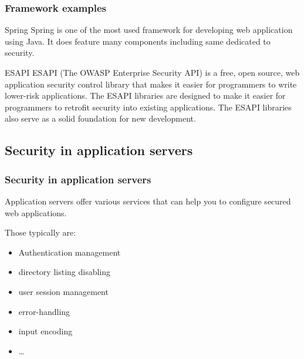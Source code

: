 \begin{frame}
\frametitle{Framework examples}

\begin{block}{Spring}
Spring is one of the most used framework for developing web
application using Java. It does feature many components including same
dedicated to security.
\end{block}

\begin{block}{ESAPI}
ESAPI (The OWASP Enterprise Security API) is a free, open source, web
application security control library that makes it easier for
programmers to write lower-risk applications. The ESAPI libraries are
designed to make it easier for programmers to retrofit security into
existing applications. The ESAPI libraries also serve as a solid
foundation for new development.
\end{block}

\end{frame}

\subsection{Security in application servers}
\begin{frame}
\frametitle{Security in application servers}
Application servers offer various services that can help you to configure
secured web applications.

Those typically are:
\begin{itemize}
\item Authentication management
\item directory listing disabling
\item user session management
\item error-handling
\item input encoding
\item \ldots
\end{itemize}
\end{frame}


